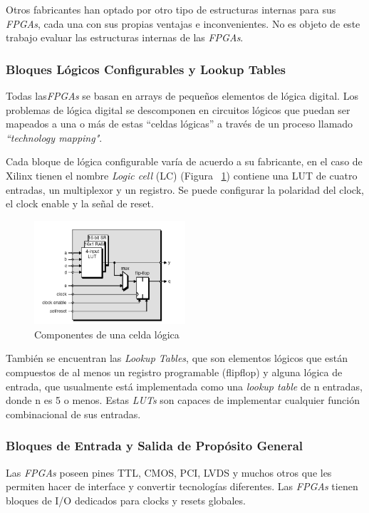 	Otros fabricantes han optado por otro tipo de estructuras internas para sus \textit{FPGAs}, cada una con sus propias ventajas e inconvenientes. No es objeto
	de este trabajo evaluar las estructuras internas de las \textit{FPGAs}.
	
		\subsubsection{Bloques Lógicos Configurables y Lookup Tables}
		Todas las\textit{FPGAs} se basan en arrays de pequeños elementos de lógica digital. Los problemas de lógica digital se descomponen en circuitos
		lógicos que puedan ser mapeados a una o más de estas “celdas lógicas” a través de un proceso llamado \textit{“technology mapping"}.
	
		Cada bloque de lógica configurable varía de acuerdo a su fabricante, en el caso de Xilinx tienen el nombre \textit{Logic cell} (LC) (Figura
		~\ref{fig:complc}) contiene una LUT de cuatro entradas, un multiplexor y un registro. Se puede configurar la polaridad del clock, el clock enable y
		la señal de reset.

		\begin{figure}[h!]
		\begin{center}
 		\includegraphics[width=0.5\textwidth,keepaspectratio=true]{./images/celda}
  		\caption{Componentes de una celda lógica}
  		\label{fig:complc}
 		\end{center}
		\end{figure}

		También se encuentran las \textit{Lookup Tables}, que son elementos lógicos que están compuestos de al menos un registro programable (flip\-flop) y
		alguna lógica de entrada, que usualmente está implementada como una \textit{lookup table} de n entradas, donde n es 5 o menos. Estas \textit{LUTs}
		son capaces de implementar cualquier función combinacional de sus entradas.

		\subsubsection{Bloques de Entrada y Salida de Propósito General}
		Las \textit{FPGAs} poseen pines TTL, CMOS, PCI, LVDS y muchos otros que les permiten hacer de interface y convertir tecnologías diferentes.
		Las \textit{FPGAs} tienen bloques de I/O dedicados para clocks y resets globales.
	
